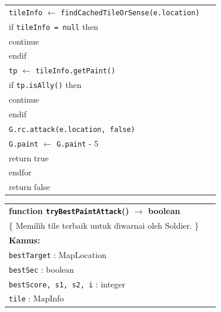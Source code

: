 \documentclass{article}
\newenvironment{pseudobox}
{
\centering
\begin{longtable}{|p{0.94\linewidth}|}
\hline
}
{
\\ \hline
\end{longtable}
\vspace{0.05cm}
}
\begin{document}
\begin{enumerate}[label=\alph*.]
\begin{enumerate}[label=\alph*.]
\begin{pseudobox}
\hspace*{3em}\texttt{tileInfo} $\leftarrow$ \texttt{findCachedTileOrSense(e.location)} \\
\hspace*{3em}if \texttt{tileInfo = null} then \\
\hspace*{4.5em}continue \\
\hspace*{3em}endif \\

\hspace*{3em}\texttt{tp} $\leftarrow$ \texttt{tileInfo.getPaint()} \\
\hspace*{3em}if \texttt{tp.isAlly()} then \\
\hspace*{4.5em}continue \\
\hspace*{3em}endif \\

\hspace*{3em}\texttt{G.rc.attack(e.location, false)} \\
\hspace*{3em}\texttt{G.paint} $\leftarrow$ \texttt{G.paint} - 5 \\
\hspace*{3em}return true \\
\hspace*{1.5em}endfor \\

\hspace*{1.5em}return false
\end{pseudobox}

\begin{pseudobox}
\textbf{function \texttt{tryBestPaintAttack}() $\rightarrow$ boolean} \\
\{ Memilih tile terbaik untuk diwarnai oleh Soldier. \} \\

\textbf{Kamus:} \\
\hspace*{1.5em}\texttt{bestTarget} : MapLocation \\
\hspace*{1.5em}\texttt{bestSec} : boolean \\
\hspace*{1.5em}\texttt{bestScore, s1, s2, i} : integer \\
\hspace*{1.5em}\texttt{tile} : MapInfo


\end{pseudobox}
\end{enumerate}
\end{enumerate}
\end{document}
